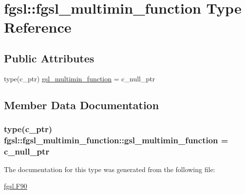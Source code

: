 \hypertarget{structfgsl_1_1fgsl__multimin__function}{}\section{fgsl\+:\+:fgsl\+\_\+multimin\+\_\+function Type Reference}
\label{structfgsl_1_1fgsl__multimin__function}
\subsection*{Public Attributes}
\begin{DoxyCompactItemize}
\item 
type(c\+\_\+ptr) \hyperlink{structfgsl_1_1fgsl__multimin__function_a4596d1a6c7d683c0160678df1df7a91e}{gsl\+\_\+multimin\+\_\+function} = c\+\_\+null\+\_\+ptr
\end{DoxyCompactItemize}


\subsection{Member Data Documentation}
\hypertarget{structfgsl_1_1fgsl__multimin__function_a4596d1a6c7d683c0160678df1df7a91e}{}
\subsubsection[{gsl\+\_\+multimin\+\_\+function}]{\setlength{\rightskip}{0pt plus 5cm}type(c\+\_\+ptr) fgsl\+::fgsl\+\_\+multimin\+\_\+function\+::gsl\+\_\+multimin\+\_\+function = c\+\_\+null\+\_\+ptr}\label{structfgsl_1_1fgsl__multimin__function_a4596d1a6c7d683c0160678df1df7a91e}


The documentation for this type was generated from the following file\+:\begin{DoxyCompactItemize}
\item 
\hyperlink{fgsl_8F90}{fgsl.\+F90}\end{DoxyCompactItemize}
